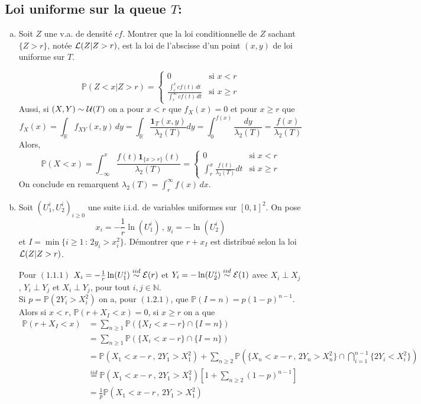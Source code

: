 \documentclass[a4paper]{article}
\begin{document}
\subsection{Loi uniforme sur la queue $T$:}
\begin{enumerate}[(a)]
\item Soit $Z$ une v.a. de densit\'e $cf$. Montrer que la loi conditionnelle de $Z$ sachant $\{Z>r\}$, not\'ee ${\cal L}(Z|Z>r)$, est la loi de l'abscisse d'un point $(x,y)$ de loi uniforme sur $T$.

$$\mathbb{P}(Z<x|Z>r) = \begin{cases}0 &\text{si $x<r$}\\\displaystyle\frac{\int_r^xcf(t)\,dt}{\int_r^{\infty}cf(t)\,dt}&\text{si $x\geq r$}\end{cases}$$
Aussi, si $(X,Y)\sim{\cal U}(T)$ on a pour $x<r$ que $f_X(x)=0$  et pour $x\geq r$ que
$$f_X(x) = \int_{\mathbb{R}}f_{XY}(x,y)\,dy = \int_{\mathbb{R}}\frac{\mathbf{1}_{T}(x,y)}{\lambda_2(T)}dy = \int_0^{f(x)}\frac{dy}{\lambda_2(T)} = \frac{f(x)}{\lambda_2(T)}$$
Alors, $$\mathbb{P}(X<x) = \int_{-\infty}^x\frac{f(t)\mathbf{1}_{\{x>r\}}(t)}{\lambda_2(T)} = \begin{cases}0 &\text{si $x<r$}\\\displaystyle\int_r^x\frac{f(t)}{\lambda_2(T)}dt&\text{si $x\geq r$}\end{cases}$$
On conclude en remarquent $\lambda_2(T) = \displaystyle\int_r^{\infty}f(x)\,dx$.


\item Soit $(U_1^i,U_2^i)_{i\geq0}$ une suite i.i.d. de variables uniformes sur $[0,1]^2$. On pose
$$x_i = -\frac{1}{r}\ln(U_1^i)\,,\,y_i = -\ln(U_2^i)$$
et $I = \min\{i\geq1\,:\,2y_i>x_i^2\}$. D\'emontrer que $r+x_I$ est distribu\'e selon la loi ${\cal L}(Z|Z>r)$.

Pour $(1.1.1)$ $X_i = -\frac{1}{r}\ln(U_1^i)\stackrel{iid}{\sim}{\cal E}(r)$ et $Y_i = -\ln(U_2^i)\stackrel{iid}{\sim}{\cal E}(1)$ avec $X_i\perp X_j$, $Y_i\perp Y_j$ et $X_i\perp Y_j$, pour tout $i,j\in\mathbb{N}$.
\\Si $p = \mathbb{P}(2Y_i>X_i^2)$ on a, pour $(1.2.1)$, que $\mathbb{P}(I=n) = p(1-p)^{n-1}$. Alors si $x<r$, $\mathbb{P}(r+X_I<x) = 0$, si $x\geq r$ on a que
\begin{align*}
\mathbb{P}(r+X_I<x) &= \sum\limits_{n\geq1}\mathbb{P}(\{X_I<x-r\}\cap\{I=n\})\\
&= \sum\limits_{n\geq1}\mathbb{P}(\{X_i<x-r\}\cap\{I=n\})\\
&= \mathbb{P}(X_1<x-r\,,\,2Y_1>X_1^2) + \sum\limits_{n\geq2}\mathbb{P}\left(\{X_n<x-r\,,\,2Y_n>X_n^2\}\cap\bigcap\limits_{i=1}^{n-1}\{2Y_i<X_i^2\}\right)\\
&\stackrel{iid}{=}\mathbb{P}(X_1<x-r\,,\,2Y_1>X_1^2)\left[ 1 + \sum\limits_{n\geq2}(1-p)^{n-1} \right]\\
&= \frac{1}{p}\mathbb{P}(X_1<x-r\,,\,2Y_1>X_1^2)
\end{align*}


\end{enumerate}
\end{document}

